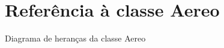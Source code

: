 \hypertarget{classAereo}{}\section{Referência à classe Aereo}
\label{classAereo}


Diagrama de heranças da classe Aereo
